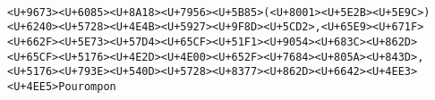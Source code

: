 \documentclass[
]{article}
\begin{document}
\begin{verbatim}
                                                                                                                                                                                                                                                                                                                                                                                                                                                                                                                                                                                                                                                                                                                                                                                                                                                                                                                                                                                                                                                                                                                                                                                                                                                                                                                                                                                                                                                                                                                                                                                                                                                                                                                                                                                                                                                                                                                                                                                                                                                                                                                                                                                                                                                                                                                                                                       <U+9673><U+6085><U+8A18><U+7956><U+5B85>(<U+8001><U+5E2B><U+5E9C>)<U+6240><U+5728><U+4E4B><U+5927><U+9F8D><U+5CD2>,<U+65E9><U+671F><U+662F><U+5E73><U+57D4><U+65CF><U+51F1><U+9054><U+683C><U+862D><U+65CF><U+5176><U+4E2D><U+4E00><U+652F><U+7684><U+805A><U+843D>,<U+5176><U+793E><U+540D><U+5728><U+8377><U+862D><U+6642><U+4EE3><U+4EE5>Pourompon 
\end{verbatim}
\end{document}
